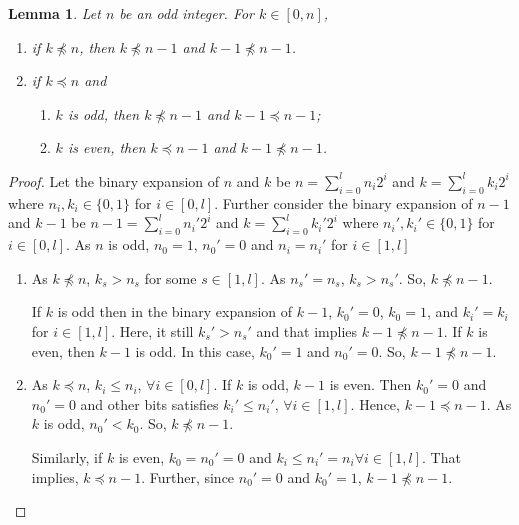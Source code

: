 \documentclass{article}[12pt]
\newtheorem{lemma}[theorem]{Lemma}
\begin{document}
\begin{lemma}\label{lem:covers}
	Let $n$ be an odd integer. For $k \in [0,n]$, 
	\begin{enumerate}
		\item if $k \npreceq n$, then $k \npreceq n-1$ and $k-1 \npreceq n-1$.
		\item if $k \preceq n$ and  
		\begin{enumerate}
		    \item $k$ is odd, then $k \npreceq n-1$ and $k-1 \preceq n-1$;
		    \item $k$ is even, then $k \preceq n-1$ and $ k-1 \npreceq n-1$.
		\end{enumerate}
	\end{enumerate}
\end{lemma}
\begin{proof}
Let the binary expansion of $n$ and $k$ be $n = \sum_{i=0}^l n_i 2^i$ and $k = \sum_{i=0}^l k_i 2^i$ where  $n_i, k_i \in \{0,1\}$ for $i \in [0,l]$.
Further consider the binary expansion of $n-1$ and $k-1$ be $n-1 = \sum_{i=0}^l n_i' 2^i$ and $k = \sum_{i=0}^l k_i' 2^i$ where  $n_i', k_i' \in \{0,1\}$ for $i \in [0,l]$.
As $n$ is odd, $n_0 = 1$, $n_0' = 0$ and $n_i = n_i'$ for $i \in [1,l]$
	\begin{enumerate}	
		\item  As $k \npreceq n$, $k_s > n_s$  for some $s \in [1,l]$.
		As $n_s' = n_s$, $k_s > n_s'$. So, $k \npreceq n-1$.
		
		If $k$ is odd then in the binary expansion of $k-1$, $k_0' = 0$, $k_0 = 1$, and $k_i' = k_i$ for $i \in [1,l]$. Here, it still $k_s' > n_s'$ and that implies $k-1 \npreceq n-1$.
		If $k$ is even, then $k-1$ is odd. In this case, $k_0' = 1$ and $n_0' = 0$. So, $k-1 \npreceq n-1$. 
		
		\item As $k \preceq n$, $k_i \leq n_i$, $\forall i \in [0, l]$. If $k$ is odd, $k-1$ is even. Then $k_0' = 0$ and $n_0' = 0$ and other bits satisfies $k_i' \leq n_i'$, $\forall i \in [1, l]$. Hence, $k-1 \preceq n-1$. As $k$ is odd, $n_0' < k_0$. So, $k \npreceq n-1$.
		
		Similarly, if $k$ is even, $k_0 = n_0' = 0$ and $k_{i} \leq n_i' = n_i \forall i\in [1,l]$. That implies, $k \preceq n-1$. Further, since $n_0' = 0$ and $k_0' = 1$, $k-1 \npreceq n-1$.
	\end{enumerate}
\end{proof}
\end{document}
